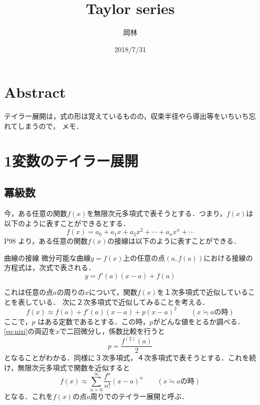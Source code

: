 \documentclass[uplatex, dvipdfmx]{jsarticle}
\title{Taylor series}
\author{岡林}
\date{2018/7/31}
\theoremstyle{definition}
\begin{document}
    \maketitle
    \abovedisplayskip=10.0pt%
    \belowdisplayskip=10.0pt%

    \section{Abstract}
    テイラー展開は，式の形は覚えているものの，収束半径やら導出等をいちいち忘れてしまうので，
    メモ．

    \section{1変数のテイラー展開}
    \subsection{冪級数}
    今，ある任意の関数$f(x)$を無限次元多項式で表そうとする．つまり，$f(x)$は以下のように表すことができるとする．
    \begin{equation}
        f(x) = a_0 + a_1 x + a_2 x^{2} + \cdots + a_n x^{n} + \cdots
    \end{equation}
    \cite{masema} P98 より，ある任意の関数$f(x)$の接線は以下のように表すことができる．

    \begin{itembox}[l]{曲線の接線}
        微分可能な曲線$y = f(x)$上の任意の点$(a, f(a))$における接線の方程式は，次式で表される．
        \begin{equation}
            y = f'(a) (x - a) + f(a)
        \end{equation}
    \end{itembox}
    
    これは任意の点$a$の周りの$x$について，関数$f(x)$を１次多項式で近似していることを表している．
    次に２次多項式で近似してみることを考える．
    \begin{equation}
        f(x) \approx f(a) + f'(a) (x - a) + p (x-a)^{2} \qquad (x \fallingdotseq a の時) \label{eq:nizi}
    \end{equation}
    ここで，$p$ はある定数であるとする．この時，$p$がどんな値をとるか調べる．
    \ref{eq:nizi}の両辺を$x$で二回微分し，係数比較を行うと
    \begin{equation}
        p = \frac{f^{(2)}(a)}{2}
    \end{equation}
    となることがわかる．同様に３次多項式，４次多項式で表そうとする．これを続け，無限次元多項式で関数を近似すると
    \begin{equation}
        f(x) \approx \sum_{n=0}^{\infty} \frac{f^{n}}{n!} (x-a)^{n} \qquad (x \fallingdotseq a の時) 
    \end{equation}
    となる．これを$f(x)$の点$a$周りでのテイラー展開と呼ぶ．
\end{document}
